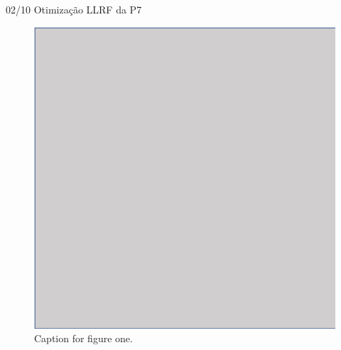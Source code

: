 \documentclass{beamer}					%
\begin{document}
\begin{frame}{02/10 Otimização LLRF da P7}
	\begin{figure}[H]
		\centering
        \includegraphics[width=.5\textwidth]{figures/figure1.png}
        \caption{Caption for figure one.}
        \label{fig:figure1}
	\end{figure}
\end{frame}
\end{document}
